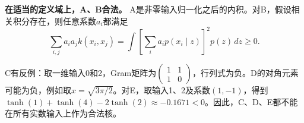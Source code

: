 \textbf{在适当的定义域上，A、B合法。} A是非零输入归一化之后的内积。对B，假设相关积分存在，则任意系数\(a_i\)都满足
\[
\sum_{i,j}a_i a_j k(x_i,x_j)
=\int\left[\sum_i a_i p(x_i\mid z)\right]^2p(z)\,dz\ge0.
\]


C有反例：取一维输入0和2，Gram矩阵为\(\begin{pmatrix}1&1\\1&0\end{pmatrix}\)，行列式为负。D的对角元素可能为负，例如取\(x=\sqrt{3\pi/2}\)。对E，取输入1、2及系数\((1,-1)\)，得到\(\tanh(1)+\tanh(4)-2\tanh(2)\approx-0.1671<0\)。因此，C、D、E都不能在所有实数输入上作为合法核。
